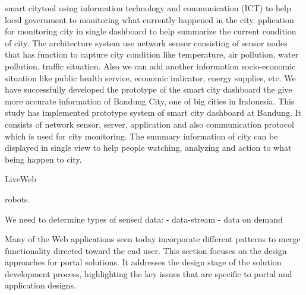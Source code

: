  smart city\cite{6588063}tool using information technology and communication (ICT) to help local government to monitoring what currently happened in the city. pplication for monitoring city in single dashboard to help summarize the current condition of city. The architecture system use network sensor consisting of sensor nodes that has
function to capture city condition like temperature, air pollution,
water pollution, traffic situation. Also we can add another information socio-economic situation like public health service, economic indicator, energy supplies, etc. We have successfully developed the prototype of the smart city dashboard the give
more accurate information of Bandung City, one of big cities in Indonesia.
This study has implemented prototype system of smart city dashboard at Bandung. It consists of network sensor, server, application and also communication protocol which is used for
city monitoring. The summary information of city can be displayed in single view to help people watching, analyzing and action to what being happen to city.
 
 LiveWeb\cite{yang2011liveweb}

 robots\cite{bendel2013service}.

 We need to determine types of sensed data:
 \newline
  - data-stream
  \newline
  - data on demand

Many of the Web applications seen today incorporate different patterns to merge
functionality directed toward the end user. This section focuses on the design approaches for portal solutions. 
It addresses the design stage of the solution development process, highlighting the key issues that are specific to portal and application designs.

